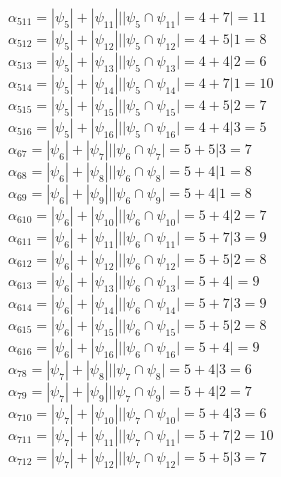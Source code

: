 \documentclass[12pt,a4paper]{report}
\begin{document}
$\alpha_{511} = |\psi_{5}| + |\psi_{11}| | |\psi_{5} \cap \psi_{11}| = 4 + 7 |   = 11$ \\
$\alpha_{512} = |\psi_{5}| + |\psi_{12}| | |\psi_{5} \cap \psi_{12}| = 4 + 5 | 1 = 8$ \\
$\alpha_{513} = |\psi_{5}| + |\psi_{13}| | |\psi_{5} \cap \psi_{13}| = 4 + 4 | 2 = 6$ \\
$\alpha_{514} = |\psi_{5}| + |\psi_{14}| | |\psi_{5} \cap \psi_{14}| = 4 + 7 | 1 = 10$ \\
$\alpha_{515} = |\psi_{5}| + |\psi_{15}| | |\psi_{5} \cap \psi_{15}| = 4 + 5 | 2 = 7$ \\
$\alpha_{516} = |\psi_{5}| + |\psi_{16}| | |\psi_{5} \cap \psi_{16}| = 4 + 4 | 3 = 5$ \\
$\alpha_{67} = |\psi_{6}| + |\psi_{7}| | |\psi_{6} \cap \psi_{7}| = 5 + 5 | 3 = 7$ \\
$\alpha_{68} = |\psi_{6}| + |\psi_{8}| | |\psi_{6} \cap \psi_{8}| = 5 + 4 | 1 = 8$ \\
$\alpha_{69} = |\psi_{6}| + |\psi_{9}| | |\psi_{6} \cap \psi_{9}| = 5 + 4 | 1 = 8$ \\
$\alpha_{610} = |\psi_{6}| + |\psi_{10}| | |\psi_{6} \cap \psi_{10}| = 5 + 4 | 2 = 7$ \\
$\alpha_{611} = |\psi_{6}| + |\psi_{11}| | |\psi_{6} \cap \psi_{11}| = 5 + 7 | 3 = 9$ \\
$\alpha_{612} = |\psi_{6}| + |\psi_{12}| | |\psi_{6} \cap \psi_{12}| = 5 + 5 | 2 = 8$ \\
$\alpha_{613} = |\psi_{6}| + |\psi_{13}| | |\psi_{6} \cap \psi_{13}| = 5 + 4 |   = 9$ \\
$\alpha_{614} = |\psi_{6}| + |\psi_{14}| | |\psi_{6} \cap \psi_{14}| = 5 + 7 | 3 = 9$ \\
$\alpha_{615} = |\psi_{6}| + |\psi_{15}| | |\psi_{6} \cap \psi_{15}| = 5 + 5 | 2 = 8$ \\
$\alpha_{616} = |\psi_{6}| + |\psi_{16}| | |\psi_{6} \cap \psi_{16}| = 5 + 4 |   = 9$ \\
$\alpha_{78} = |\psi_{7}| + |\psi_{8}| | |\psi_{7} \cap \psi_{8}| = 5 + 4 | 3 = 6$ \\
$\alpha_{79} = |\psi_{7}| + |\psi_{9}| | |\psi_{7} \cap \psi_{9}| = 5 + 4 | 2 = 7$ \\
$\alpha_{710} = |\psi_{7}| + |\psi_{10}| | |\psi_{7} \cap \psi_{10}| = 5 + 4 | 3 = 6$ \\
$\alpha_{711} = |\psi_{7}| + |\psi_{11}| | |\psi_{7} \cap \psi_{11}| = 5 + 7 | 2 = 10$ \\
$\alpha_{712} = |\psi_{7}| + |\psi_{12}| | |\psi_{7} \cap \psi_{12}| = 5 + 5 | 3 = 7$ \\
\end{document}
